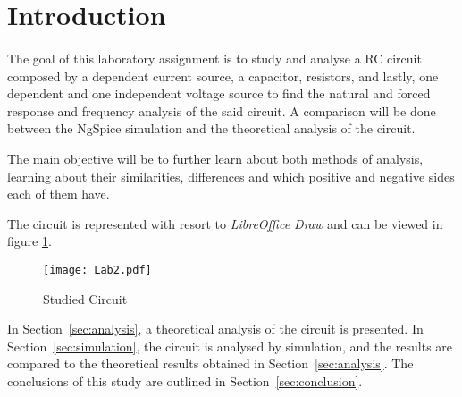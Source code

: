 \section{Introduction}
\label{sec:introduction}
\paragraph{}
\par The goal of this laboratory assignment is to study and analyse a RC circuit composed by a dependent current source, a capacitor, resistors, and  lastly, one dependent and one independent voltage source to find the natural and forced response and frequency analysis of the said circuit.
A comparison will be done between the NgSpice simulation and the theoretical analysis of the circuit.
\par The main objective will be to further learn about both methods of analysis, learning about their similarities, differences and which positive and negative sides each of them have. 
\par The circuit is represented with resort to \textit{LibreOffice Draw} and can be viewed in figure \ref{circuit}.

\begin{figure}[H]
    \texttt{[image: Lab2.pdf]}
    \centering
    \caption{Studied Circuit}
    \label{circuit}
\end{figure}


In Section~\ref{sec:analysis}, a theoretical analysis of the circuit is
presented. In Section~\ref{sec:simulation}, the circuit is analysed by
simulation, and the results are compared to the theoretical results obtained in
Section~\ref{sec:analysis}. The conclusions of this study are outlined in
Section~\ref{sec:conclusion}.
